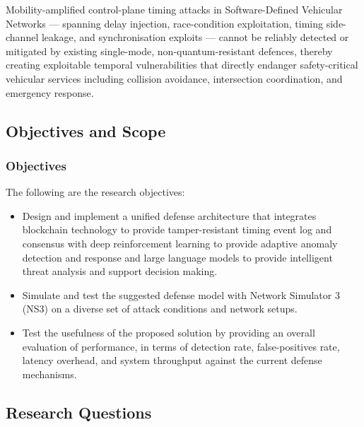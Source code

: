 Mobility-amplified control-plane timing attacks in Software-Defined Vehicular
Networks — spanning delay injection, race-condition exploitation, timing
side-channel leakage, and synchronisation exploits — cannot be reliably
detected or mitigated by existing single-mode, non-quantum-resistant
defences, thereby creating exploitable temporal vulnerabilities that directly
endanger safety-critical vehicular services including collision avoidance,
intersection coordination, and emergency response.

\subsection{Objectives and Scope}

\subsubsection{Objectives}

The following are the research objectives:

\begin{itemize}
    \item Design and implement a unified defense architecture that integrates blockchain technology to provide tamper-resistant timing event log and consensus with deep reinforcement learning to provide adaptive anomaly detection and response and large language models to provide intelligent threat analysis and support decision making.
    
    \item Simulate and test the suggested defense model with Network Simulator 3 (NS3) on a diverse set of attack conditions and network setups.
    
    \item Test the usefulness of the proposed solution by providing an overall evaluation of performance, in terms of detection rate, false-positives rate, latency overhead, and system throughput against the current defense mechanisms.
\end{itemize}

\subsection{Research Questions}
\label{sec:rqs}

